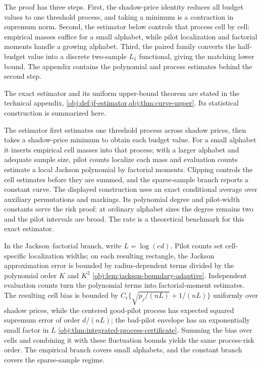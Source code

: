 \documentclass[11pt]{article}
\begin{document}
The proof has three steps. First, the shadow-price identity reduces all budget values to one threshold process, and taking a minimum is a contraction in supremum norm. Second, the estimator below controls that process cell by cell: empirical masses suffice for a small alphabet, while pilot localization and factorial moments handle a growing alphabet. Third, the paired family converts the half-budget value into a discrete two-sample \(L_1\) functional, giving the matching lower bound. The appendix contains the polynomial and process estimates behind the second step.

The exact estimator and its uniform upper-bound theorem are stated in the technical appendix, \cref{obj:def:jf-estimator,obj:thm:curve-upper}. Its statistical construction is summarized here.



The estimator first estimates one threshold process across shadow prices, then takes a shadow-price minimum to obtain each budget value. For a small alphabet it inserts empirical cell masses into that process; with a larger alphabet and adequate sample size, pilot counts localize each mass and evaluation counts estimate a local Jackson polynomial by factorial moments. Clipping controls the cell estimates before they are summed, and the sparse-sample branch reports a constant curve. The displayed construction uses an exact conditional average over auxiliary permutations and markings. Its polynomial degree and pilot-width constants serve the risk proof: at ordinary alphabet sizes the degree remains two and the pilot intervals are broad. The rate is a theoretical benchmark for this exact estimator.

In the Jackson--factorial branch, write \(L=\log(ed)\). Pilot counts set cell-specific localization widths; on each resulting rectangle, the Jackson approximation error is bounded by radius-dependent terms divided by the polynomial order \(K\) and \(K^2\) \cref{obj:lem:jackson-boundary-adaptive}. Independent evaluation counts turn the polynomial terms into factorial-moment estimates. The resulting cell bias is bounded by \(C_\epsilon\{\sqrt{p_j/(nL)}+1/(nL)\}\) uniformly over shadow prices, while the centered good-pilot process has expected squared supremum error of order \(d/(nL)\); the bad-pilot envelope has an exponentially small factor in \(L\) \cref{obj:thm:integrated-process-certificate}. Summing the bias over cells and combining it with these fluctuation bounds yields the same process-risk order. The empirical branch covers small alphabets, and the constant branch covers the sparse-sample regime.
\end{document}
